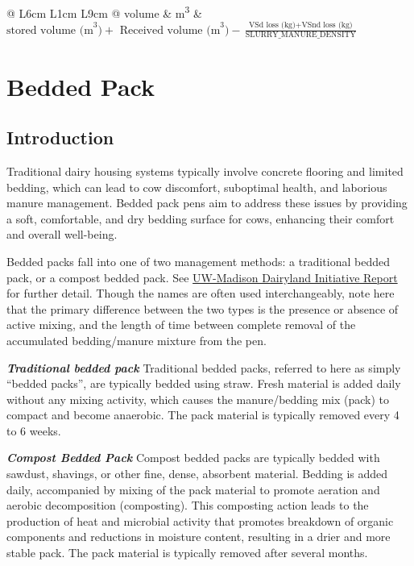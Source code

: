 \begin{refsection}
\begin{longtable}{@{} L{6cm} L{1cm} L{9cm} @{}}
volume  & m\textsuperscript{3} & 
\(
\text{stored volume (m}^3\text{)} 
+ \text{ Received volume (m}^3\text{)}
- \frac{\text{VSd loss (kg)} + \text{VSnd loss (kg)}}{\text{SLURRY\_MANURE\_DENSITY}}\)

\end{longtable}





 
\newpage
\section{Bedded Pack}
 
\subsection{Introduction} Traditional dairy housing systems typically involve concrete flooring and limited bedding, which can lead to cow discomfort, suboptimal health, and laborious manure management. Bedded pack pens aim to address these issues by providing a soft, comfortable, and dry bedding surface for cows, enhancing their comfort and overall well-being.
\vspace{0.2cm}
    
Bedded packs fall into one of two management methods: a traditional bedded pack, or a compost bedded pack. See \href{https://thedairylandinitiative.vetmed.wisc.edu/home/housing-module/adult-cow-housing/bedded-pack/}{UW-Madison Dairyland Initiative Report} for further detail. Though the names are often used interchangeably, note here that the primary difference between the two types is the presence or absence of active mixing, and the length of time between complete removal of the accumulated bedding/manure mixture from the pen.
    \vspace{0.2cm}
    
    \textbf{\textit{Traditional bedded pack}}
    Traditional bedded packs, referred to here as simply “bedded packs”, are typically bedded using straw. Fresh material is added daily without any mixing activity, which causes the manure/bedding mix (pack) to compact and become anaerobic. The pack material is typically removed every 4 to 6 weeks.
    \vspace{0.2cm}
    
    \textbf{\textit{Compost Bedded Pack}}
    Compost bedded packs are typically bedded with sawdust, shavings, or other fine, dense, absorbent material. Bedding is added daily, accompanied by mixing of the pack material to promote aeration and aerobic decomposition (composting). This composting action leads to the production of heat and microbial activity that promotes breakdown of organic components and reductions in moisture content, resulting in a drier and more stable pack. The pack material is typically removed after several months.
    \vspace{0.2cm}
    

\end{refsection}
